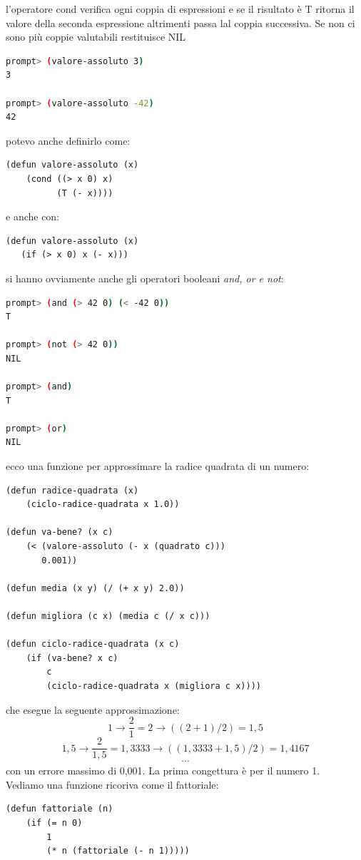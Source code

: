 \documentclass[a4paper,12pt, oneside]{book}
\begin{document}
l'operatore cond verifica ogni coppia di espressioni e se il risultato è T ritorna il valore della seconda espressione altrimenti passa lal coppia successiva. Se non ci sono più coppie valutabili restituisce NIL
\begin{shaded}
\begin{lstlisting}[language=bash]
prompt> (valore-assoluto 3)
3

prompt> (valore-assoluto -42)
42
\end{lstlisting}
\end{shaded}
potevo anche definirlo come:
\begin{verbatim}
(defun valore-assoluto (x)
    (cond ((> x 0) x)
          (T (- x))))
\end{verbatim}
e anche con:
\begin{verbatim}
(defun valore-assoluto (x)
   (if (> x 0) x (- x)))
\end{verbatim}
si hanno ovviamente anche gli operatori booleani \textit{and, or e not}:
\begin{shaded}
\begin{lstlisting}[language=bash]
prompt> (and (> 42 0) (< -42 0))
T

prompt> (not (> 42 0))
NIL

prompt> (and)
T

prompt> (or)
NIL
\end{lstlisting}
\end{shaded}
ecco una funzione per approssimare la radice quadrata di un numero:
\begin{verbatim}
(defun radice-quadrata (x)
    (ciclo-radice-quadrata x 1.0))

(defun va-bene? (x c)
    (< (valore-assoluto (- x (quadrato c)))
       0.001))
       
(defun media (x y) (/ (+ x y) 2.0))

(defun migliora (c x) (media c (/ x c)))

(defun ciclo-radice-quadrata (x c)
    (if (va-bene? x c)
        c
        (ciclo-radice-quadrata x (migliora c x))))

\end{verbatim}
che esegue la seguente approssimazione:
$$1\to \frac{2}{1}=2 \to ((2+1)/2)=1,5$$
$$1,5 \to \frac{2}{1,5}=1,3333\to ((1,3333+1,5)/2)=1,4167$$
$$\cdots$$
con un errore massimo di 0,001. La prima congettura è per il numero 1.\\
Vediamo una funzione ricoriva come il fattoriale:
\begin{verbatim}
(defun fattoriale (n)
    (if (= n 0)
        1
        (* n (fattoriale (- n 1)))))
\end{verbatim}
\end{document}
